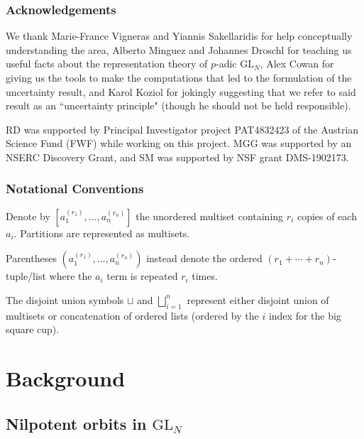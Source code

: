 \documentclass{amsart}
\newcommand{\GL}{\mathrm{GL}}
\newcommand{\1}{\m 1}
\theoremstyle{remark}
\theoremstyle{definition}
\numberwithin{equation}{subsection}
\newcommand{\red}[1]{\textcolor{red}{#1}}
\begin{document}
\subsubsection*{Acknowledgements}
We thank Marie-France Vigneras and Yiannis Sakellaridis for help conceptually understanding the area, Alberto Minguez and Johannes Droschl for teaching us useful facts about the representation theory of $p$-adic $\GL_N$, Alex Cowan for giving us the tools to make the computations that led to the formulation of the uncertainty result, and Karol Koziol for jokingly suggesting that we refer to said result as an ``uncertainty principle" (though he should not be held responsible). 

RD was supported by Principal Investigator project PAT4832423 of the Austrian Science Fund (FWF) while working on this project. MGG was supported by an NSERC Discovery Grant, and SM was supported by NSF grant DMS-1902173.


\subsubsection*{Notational Conventions}
Denote by $[a_1^{(r_1)}, \dotsc, a_n^{(r_n)}]$ the unordered multiset containing $r_i$ copies of each $a_i$. Partitions are represented as multisets. 

Parentheses $(a_1^{(r_1)}, \dotsc, a_n^{(r_n)})$ instead denote the ordered $(r_1 + \cdots + r_n)$-tuple/list where the $a_i$ term is repeated $r_i$ times. 

The disjoint union symbols $\sqcup$  and $\bigsqcup_{i=1}^n$ represent either disjoint union of multisets or concatenation of ordered lists (ordered by the $i$ index for the big square cup). 



















\section{Background}\label{sec:background}
\subsection{Nilpotent orbits in $\GL_N$}
\end{document}
